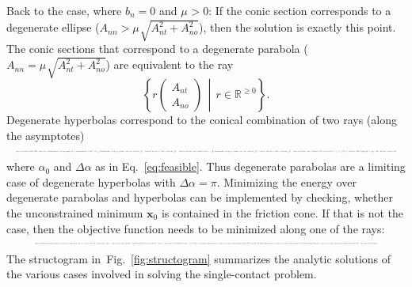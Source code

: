 \documentclass[global,twocolumn]{svjour}
\let\vec\bm
\newcommand{\setprop}[2]{\ensuremath{\left\{ #1 \,\middle|\, #2 \right\}}}
\newcommand{\mat}[1]{{\bf #1}}
\newcommand{\R}{\mathbb{R}}
\newcommand{\dvect}[2]{\ensuremath{\begin{pmatrix}#1\\#2\end{pmatrix}}}
\newcommand{\transp}{{\mathrm{T}}}
\newcommand{\cof}[1]{\ensuremath{\mu_{#1}}}
\renewcommand{\figref}[1]{Fig.~\ref{#1}}
\newcommand{\shrinkeqnnew}[2]{\resizebox{#1\linewidth}{!}{\begin{varwidth}[t]{2\linewidth}\ensuremath{\displaystyle{#2}}\end{varwidth}}}
\begin{document}
			Back to the case, where $b_n = 0$ and $\cof{} > 0$: If the conic section corresponds to
			a degenerate ellipse ($A_{nn} > \cof{} \sqrt{A_{nt}^2 + A_{no}^2}$),
			then the solution is exactly this point. The conic sections that
			correspond to a degenerate parabola ($A_{nn} = \cof{} \sqrt{A_{nt}^2 + A_{no}^2}$)
			are equivalent to the ray
			\begin{equation*}
				\setprop{r\dvect{A_{nt}}{A_{no}}}{r \in \R^{\geq 0}}.
			\end{equation*}
			Degenerate hyperbolas correspond to the conical combination of two rays (along the asymptotes)
			\begin{equation*}
				\shrinkeqnnew{1}{
				\setprop{r_1\dvect{\cos (\alpha_0 - \Delta \alpha)}{\sin (\alpha_0 - \Delta \alpha)} + r_2 \dvect{\cos (\alpha_0 + \Delta \alpha)}{\sin (\alpha_0 + \Delta \alpha)}}{r_1, r_2 \in \R^{\geq 0}},
				}
			\end{equation*}
			where $\alpha_0$ and $\Delta \alpha$ as in Eq.~\eqref{eq:feasible}.
			Thus degenerate parabolas are a limiting case of degenerate hyperbolas with $\Delta \alpha = \pi$.
			Minimizing the energy over degenerate parabolas and hyperbolas can
			be implemented by checking, whether the unconstrained minimum $\vec x_0$ is contained
			in the friction cone. If that is not the case, then the objective function
			needs to be minimized along one of the rays:
			\begin{equation}
				\shrinkeqnnew{0.9}{
				\begin{split}
					\alpha_* & \in 2\pi\mathbb{N} + \begin{cases}
						\alpha_0 - \Delta \alpha & \text{if $(A_{no}, -A_{nt})^\transp \vec x_{0,to} \geq 0$} \\
						\alpha_0 + \Delta \alpha & \text{else}
					\end{cases}, \\
					r_* & = \max(0, (\dvect{\cos\alpha_*}{\sin\alpha_*}^\transp \mat{\hat{A}} \dvect{\cos\alpha_*}{\sin\alpha_*})^{-1} \dvect{\cos\alpha_*}{\sin\alpha_*}^\transp \vec{\hat{b}}).
				\end{split}
				}
				\label{eq:degenerate}
			\end{equation}
			The structogram in~\figref{fig:structogram} summarizes the analytic
			solutions of the various cases involved in solving the single-contact
			problem.
\end{document}
